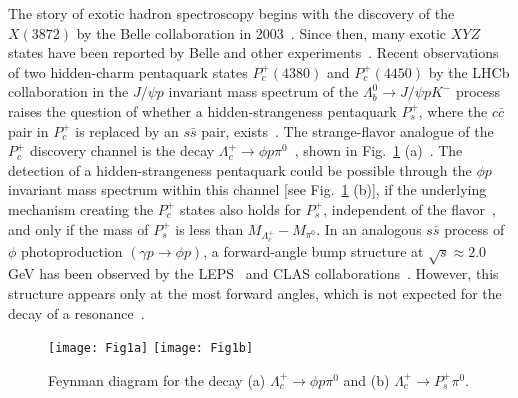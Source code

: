 \documentclass[aps,prl,twocolumn,superscriptaddress,showpacs,preprintnumbers,amsmath,amssymb]{revtex4-1}
\begin{document}

\maketitle

\tighten
The story of exotic hadron  spectroscopy   begins  with the  discovery  of  the
$X(3872)$ by the Belle collaboration in 2003~\cite{Choi:2003ue}. Since then, many exotic $X\!Y\!Z$ states have been reported by Belle and other experiments~\cite{Rev_xyz}. Recent observations of two hidden-charm pentaquark  states $P_c^+(4380)$ and $P_c^+(4450)$ by the LHCb collaboration in the $J/\psi p$ invariant mass spectrum of the  $\Lambda_b^0\to J/\psi pK^- $ process~\cite{Aaij:2015tga} raises the question of whether a hidden-strangeness pentaquark  $P_s^+$, where the $c\bar{c}$ pair  in  $P_c^+$  is replaced by  an $s\bar{s}$ pair, exists~\cite{Kopeliovich:2015vqa, Zhu:2015bba, Lebed:2015dca}. The strange-flavor analogue of the $P_c^+$ discovery channel is the decay $\Lambda_c^+\to\phi p\pi^0$~\cite{Kopeliovich:2015vqa, Lebed:2015dca}, shown in Fig.~\ref{fig:Feynman} (a)~\cite{charge-conjugate}. The detection of a hidden-strangeness pentaquark could be possible through  the $\phi p$ invariant mass spectrum within this channel [see Fig.~\ref{fig:Feynman} (b)],
if the underlying mechanism creating the $P_c^+$ states also holds for $P_s^+$, independent of the flavor~\cite{Lebed:2015dca}, and only if  the mass of $P_s^+$ is less than $M_{\Lambda_c^+}-M_{\pi^0}$.  
In an analogous $s\bar{s}$ process of $\phi$ photoproduction $(\gamma p\to\phi p)$,  a forward-angle  bump structure at $\sqrt{s}\approx2.0$ GeV 
has been observed by  the LEPS~\cite{Mibe:2005er} and CLAS collaborations~\cite{Dey:2014tfa}.
However, this structure appears only at the most forward angles, %
which is  not   expected for  the decay of a resonance~\cite{Lebed:2015fpa}.
\begin{figure}[htb]
\centering
\texttt{[image: Fig1a]}%
\texttt{[image: Fig1b]}
\caption{\small Feynman diagram for the decay (a) $\Lambda_c^+\to\phi p\pi^0$ and (b) $\Lambda_c^+\to P_s^+\pi^0$.}
\label{fig:Feynman}
\end{figure}
\end{document}
